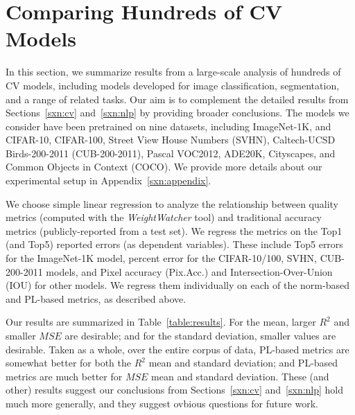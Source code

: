 \section{Comparing Hundreds of CV Models}
\label{sxn:all_cv_models}

In this section, we summarize results from a large-scale analysis of hundreds of CV models, including models developed for image classification, segmentation, and a range of related tasks.  
Our aim is to complement the detailed results from Sections~\ref{sxn:cv} and~\ref{sxn:nlp} by providing broader conclusions. %
The models we consider have been pretrained on nine datasets, including ImageNet-1K, and CIFAR-10, CIFAR-100, Street View House Numbers (SVHN), Caltech-UCSD Birds-200-2011 (CUB-200-2011), Pascal VOC2012, ADE20K, Cityscapes, and Common Objects in Context (COCO). 
We provide more details about our experimental setup in Appendix~\ref{sxn:appendix}.

We choose simple linear regression to analyze the relationship between quality metrics (computed with the \emph{WeightWatcher} tool) and traditional accuracy metrics (publicly-reported from a test set).
We regress the metrics on the Top1 (and Top5) reported errors (as dependent variables).  
These include Top5 errors for the ImageNet-1K model, percent error for the CIFAR-10/100, SVHN, CUB-200-2011 models, and Pixel accuracy (Pix.Acc.) and Intersection-Over-Union (IOU) for other models.
We regress them individually on each of the norm-based and PL-based metrics, as described above.

Our results are summarized in Table~\ref{table:results}.
For the mean, larger $R^{2}$ and smaller $MSE$ are desirable; and for the standard deviation, smaller values are desirable.
Taken as a whole, over the entire corpus of data, PL-based metrics are somewhat better for both the $R^{2}$ mean and standard deviation; and PL-based metrics are much better for $MSE$ mean and standard deviation.
These (and other) results suggest our conclusions from Sections~\ref{sxn:cv} and~\ref{sxn:nlp} hold much more generally, and they suggest ovbious questions for future work.


